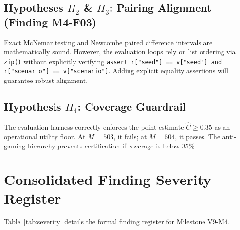 \documentclass[10pt,a4paper]{article}
\begin{document}
\subsection{Hypotheses $H_2$ \& $H_3$: Pairing Alignment (\textbf{Finding M4-F03})}
Exact McNemar testing and Newcombe paired difference intervals are mathematically sound. However, the evaluation loops rely on list ordering via \texttt{zip()} without explicitly verifying \texttt{assert r["seed"] == v["seed"] and r["scenario"] == v["scenario"]}. Adding explicit equality assertions will guarantee robust alignment.

\subsection{Hypothesis $H_4$: Coverage Guardrail}
The evaluation harness correctly enforces the point estimate $\hat{C} \ge 0.35$ as an operational utility floor. At $M=503$, it fails; at $M=504$, it passes. The anti-gaming hierarchy prevents certification if coverage is below 35\%.

\section{Consolidated Finding Severity Register}
Table~\ref{tab:severity} details the formal finding register for Milestone V9-M4.
\end{document}
